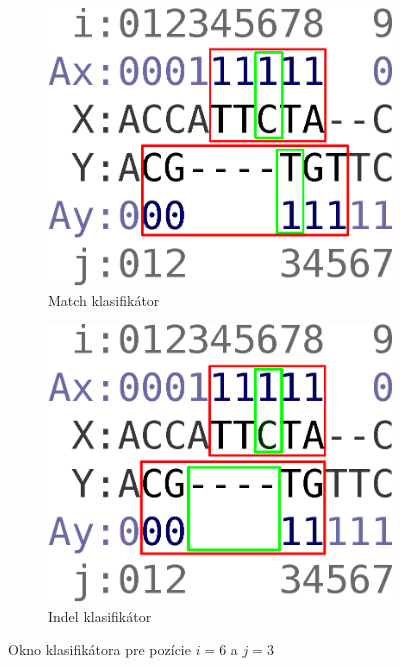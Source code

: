 \begin{figure}[h]
        \centering
        \begin{subfigure}[b]{0.35\textwidth}
                \includegraphics[width=\textwidth]{images/window_m}
                \caption{Match klasifikátor}
                \label{fig:window-m}
        \end{subfigure}%
        \qquad\qquad %
        \begin{subfigure}[b]{0.35\textwidth}
                \includegraphics[width=\textwidth]{images/window_i}
                \caption{Indel klasifikátor}
                \label{fig:window-i}
        \end{subfigure}
        \caption[Okno klasifikátora]{Okno klasifikátora pre pozície $i = 6$ a $j = 3$}
\end{figure}

